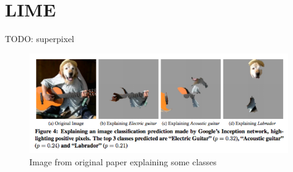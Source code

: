 \section{LIME}
TODO: superpixel

\begin{figure}[h]
\centering
\caption{Image from original paper explaining some classes}
\includegraphics[width=14cm]{chapters/02_methods/images/lime.png}
\end{figure}
